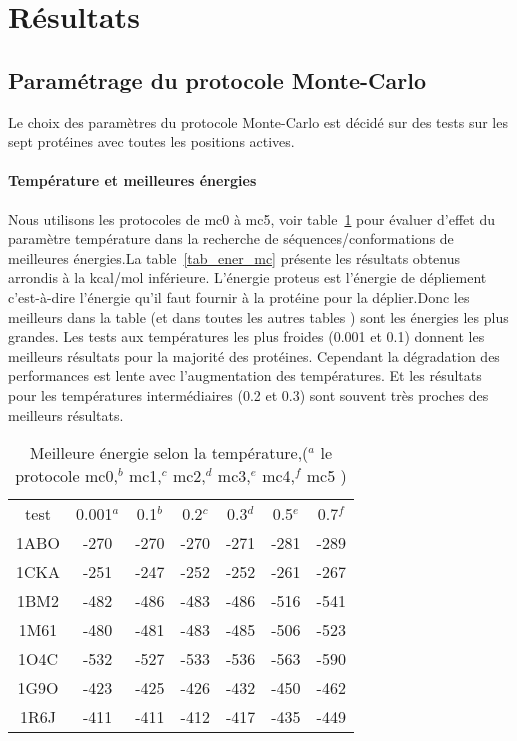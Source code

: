 \clearpage

    \section{Résultats} 

    \subsection{Paramétrage du protocole Monte-Carlo}

Le choix des paramètres du protocole Monte-Carlo est décidé sur des tests sur les sept protéines avec toutes les positions actives.


   \paragraph{Température et meilleures énergies} 
Nous utilisons les protocoles de mc0 à mc5, voir table~\ref{tab:ener_mc} pour évaluer d'effet du paramètre température dans la recherche de séquences/conformations de meilleures énergies.La table~\ref{tab_ener_mc} présente les résultats obtenus arrondis à la kcal/mol inférieure. L'énergie proteus est l'énergie de dépliement c'est-à-dire l'énergie qu'il faut fournir à la protéine pour la déplier.Donc les meilleurs dans la table (et dans toutes les autres tables ) sont les énergies les plus grandes. Les tests aux températures les plus froides (0.001 et 0.1) donnent les meilleurs résultats  pour la majorité des protéines. Cependant la dégradation des performances est lente avec l'augmentation des températures. Et les résultats pour les températures intermédiaires (0.2 et 0.3) sont souvent très proches des meilleurs résultats.    

    \begin{table}[!htbp]
      \centering

      \begin{tabular}{ccccccc}
     
        \toprule
         test & 0.001$^a$ & 0.1$^b$ & 0.2$^c$  & 0.3$^d$ & 0.5$^e$ & 0.7$^f$  \\
        \cmidrule{1-7}
        1ABO & -270 & -270 & -270 & -271 & -281  & -289 \\      
        1CKA & -251 & -247 & -252 & -252 & -261  & -267 \\  
        1BM2 & -482 & -486 & -483 & -486 & -516  & -541 \\  
        1M61 & -480 & -481 & -483 & -485 & -506  & -523 \\  
        1O4C & -532 & -527 & -533 & -536 & -563  & -590 \\  
        1G9O & -423 & -425 & -426 & -432 & -450  & -462 \\  
        1R6J & -411 & -411 & -412 & -417 & -435  & -449 \\  

        \bottomrule        
      \end{tabular}
      

      \caption{Meilleure énergie selon la température,($^a$ le protocole mc0,$^b$ mc1,$^c$  mc2,$^d$ mc3,$^e$ mc4,$^f$ mc5 )}    
      \label{tab:ener_mc}
    \end{table}
 
